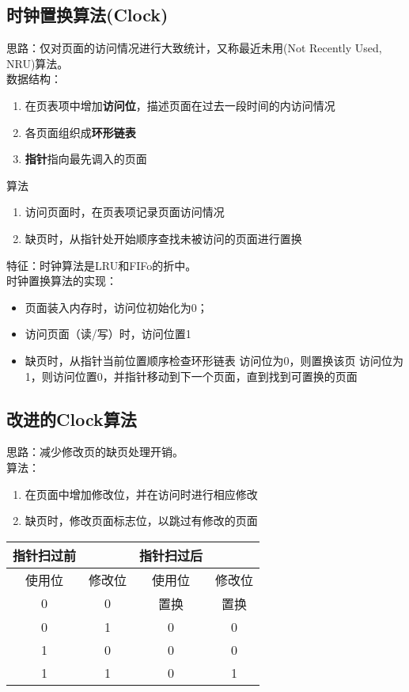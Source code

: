 \subsection{时钟置换算法(Clock)}
思路：仅对页面的访问情况进行大致统计，又称最近未用(Not Recently Used, NRU)算法。\\
数据结构：
\begin{enumerate}
	\item 在页表项中增加\textbf{访问位}，描述页面在过去一段时间的内访问情况
	\item 各页面组织成\textbf{环形链表}
	\item \textbf{指针}指向最先调入的页面
\end{enumerate}
算法
\begin{enumerate}
	\item 访问页面时，在页表项记录页面访问情况
	\item 缺页时，从指针处开始顺序查找未被访问的页面进行置换
\end{enumerate}
特征：时钟算法是LRU和FIFo的折中。\\
时钟置换算法的实现：
\begin{itemize}
	\item 页面装入内存时，访问位初始化为0；
	\item 访问页面（读/写）时，访问位置1
	\item 缺页时，从指针当前位置顺序检查环形链表
	\subitem 访问位为0，则置换该页
	\subitem 访问位为1，则访问位置0，并指针移动到下一个页面，直到找到可置换的页面
\end{itemize}
\subsection{改进的Clock算法}
思路：减少修改页的缺页处理开销。\\
算法：
\begin{enumerate}
	\item 在页面中增加修改位，并在访问时进行相应修改
	\item 缺页时，修改页面标志位，以跳过有修改的页面
\end{enumerate}
\begin{table}[!h]
	\centering
	\begin{tabular}{|c|c|c|c|}
		\hline
		指针扫过前&&指针扫过后&\\
		\hline
		使用位&修改位&使用位&修改位\\
		\hline
		0&0&置换&置换\\
		\hline
		0&1&0&0\\
		\hline
		1&0&0&0\\
		\hline
		1&1&0&1\\
		\hline
	\end{tabular}
\end{table}
